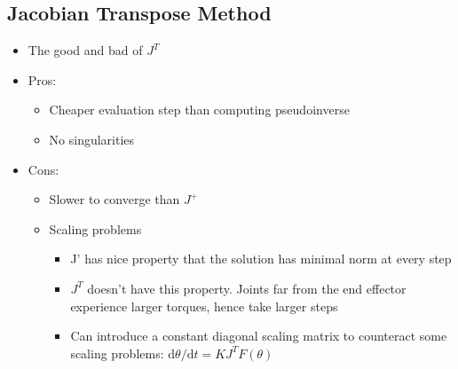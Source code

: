 \documentclass{article}
\newcommand{\der}{\text{d}}
\begin{document}
\subsection*{Jacobian Transpose Method}
\begin{itemize}
    \item The good and bad of $J^T$
    \item Pros:
    \begin{itemize}
        \item Cheaper evaluation step than computing pseudoinverse
        \item No singularities
    \end{itemize}
    \item Cons:
    \begin{itemize}
        \item Slower to converge than $J^+$
        \item Scaling problems
        \begin{itemize}
            \item J' has nice property that the solution has minimal norm at every step
            \item $J^T$ doesn't have this property.  Joints far from the end effector experience larger torques, hence take larger steps
            \item Can introduce a constant diagonal scaling matrix to counteract some scaling problems: $\der\theta/\der t = KJ^TF(\theta)$
        \end{itemize}
    \end{itemize}
\end{itemize}
\end{document}
